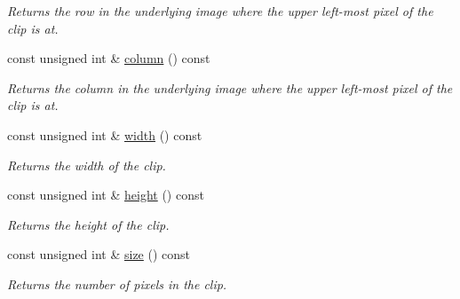 \begin{CompactItemize}
\begin{CompactList}\small\item\em Returns the row in the underlying image where the upper left-most pixel of the clip is at. \item\end{CompactList}\item 
const unsigned int \& \hyperlink{class_clip_06a34378fa0f23425d10bb04e9972a26}{column} () const 
\begin{CompactList}\small\item\em Returns the column in the underlying image where the upper left-most pixel of the clip is at. \item\end{CompactList}\item 
const unsigned int \& \hyperlink{class_clip_88d1a47c0ec077e8c6680785509389b0}{width} () const 
\begin{CompactList}\small\item\em Returns the width of the clip. \item\end{CompactList}\item 
const unsigned int \& \hyperlink{class_clip_939908a8dde602d25335792cc0fd5d97}{height} () const 
\begin{CompactList}\small\item\em Returns the height of the clip. \item\end{CompactList}\item 
const unsigned int \& \hyperlink{class_clip_eb6b12a1a0570b529d6a09633b991fcd}{size} () const 
\begin{CompactList}\small\item\em Returns the number of pixels in the clip. \item\end{CompactList}\end{CompactItemize}
